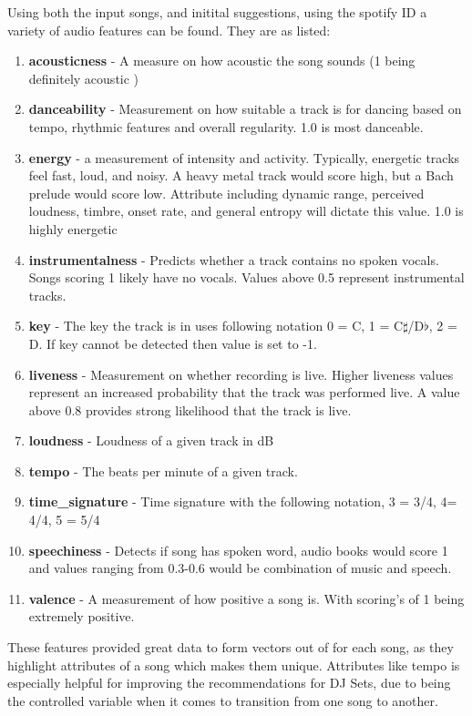 Using both the input songs, and initital suggestions, using the spotify ID a variety of audio features can be found. They are as listed:

\begin{enumerate}
	\item \textbf{acousticness} - A measure on how acoustic the song sounds (1 being definitely acoustic  )
	\item \textbf{danceability} - Measurement on how suitable a track is for dancing based on tempo, rhythmic features and overall regularity. 1.0 is most danceable. 
	\item \textbf{energy} - a measurement of intensity and activity. Typically, energetic tracks feel fast, loud, and noisy. A heavy metal track would score high, but a Bach prelude would score low. Attribute including dynamic range, perceived loudness, timbre, onset rate, and general entropy will dictate this value. 1.0 is highly energetic
	\item \textbf{instrumentalness} - Predicts whether a track contains no spoken vocals. Songs scoring 1 likely have no vocals. Values above 0.5 represent instrumental tracks.
	\item \textbf{key} - The key the track is in uses following notation 0 = C, 1 = C$\sharp$/D$\flat$, 2 = D. If key cannot be detected then value is set to -1.
	\item \textbf{liveness} - Measurement on whether recording is live. Higher liveness values represent an increased probability that the track was performed live. A value above 0.8 provides strong likelihood that the track is live.
	\item \textbf{loudness} - Loudness of a given track in dB
	\item \textbf{tempo} - The beats per minute of a given track.
	\item \textbf{time\_signature} - Time signature with the following notation, 3 = 3/4, 4= 4/4, 5 = 5/4
	\item \textbf{speechiness} - Detects if song has spoken word, audio books would score 1 and values ranging from 0.3-0.6 would be combination of music and speech.
	\item \textbf{valence} - A measurement of how positive a song is. With scoring's of 1 being extremely positive.
	
\end{enumerate}

These features provided great data to form vectors out of for each song, as they highlight attributes of a song which makes them unique. Attributes like tempo is especially helpful for improving the recommendations for DJ Sets, due to being the controlled variable when it comes to transition from one song to another.

